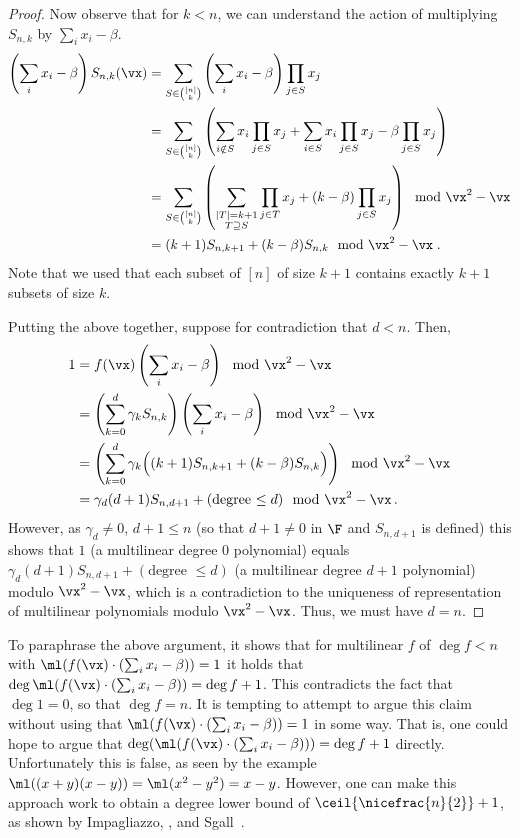 \documentclass[11pt]{article}
\numberwithin{equation}{section}
\theoremstyle{definition}
\theoremstyle{plain}
\begin{document}
\begin{proof}
        Now observe that for $k<n$, we can understand the action of multiplying $S_{n,k}$ by $\sum_i x_i-\beta$.
        \begin{align*}
                \left(\sum_i x_i-\beta\right) S_{n,k}(\vx)
                &=\sum_{S\in\binom{[n]}{k}} \left(\sum_i x_i-\beta\right) \prod_{j\in S} x_j\\
                &=\sum_{S\in\binom{[n]}{k}} \left(\sum_{i\notin S} x_i \prod_{j\in S} x_j+\sum_{i\in S} x_i \prod_{j\in S} x_j-\beta \prod_{j\in S} x_j\right)\\
                &=\sum_{S\in\binom{[n]}{k}} \left(\sum_{\substack{|T|=k+1\\T\supseteq S}} \prod_{j\in T}x_j +(k-\beta) \prod_{j\in S} x_j\right) \mod \vx^2-\vx\\
                &=(k+1)S_{n,k+1}+(k-\beta)S_{n,k}\mod \vx^2-\vx
                \;.
        \end{align*}
        Note that we used that each subset of $[n]$ of size $k+1$ contains exactly $k+1$ subsets of size $k$.

        Putting the above together, suppose for contradiction that $d<n$.  Then,
        \begin{align*}
                1
                &=f(\vx)\left(\sum_i x_i-\beta\right) \mod \vx^2-\vx\\
                &=\left(\sum_{k=0}^d \gamma_k S_{n,k}\right)\left(\sum_i x_i-\beta\right) \mod \vx^2-\vx\\
                &=\left(\sum_{k=0}^d \gamma_k \Big((k+1)S_{n,k+1}+(k-\beta)S_{n,k}\Big)\right) \mod \vx^2-\vx\\
                &=\gamma_d(d+1)S_{n,d+1} + (\text{degree $\le d$}) \mod \vx^2-\vx\,.
        \end{align*}
        However, as $\gamma_d\ne 0$, $d+1\le n$ (so that $d+1\ne 0$ in $\F$ and $S_{n,d+1}$ is defined) this shows that $1$ (a multilinear degree 0 polynomial) equals $\gamma_d(d+1)S_{n,d+1} + (\text{degree $\le d$})$ (a multilinear degree $d+1$ polynomial) modulo $\vx^2-\vx$, which is a contradiction to the uniqueness of representation of multilinear polynomials modulo $\vx^2-\vx$.  Thus, we must have $d=n$.
\end{proof}

To paraphrase the above argument, it shows that for multilinear $f$ of $\deg f<n$ with $\ml(f(\vx)\cdot (\sum_i x_i-\beta))=1$ it holds that $\deg \ml(f(\vx)\cdot (\sum_i x_i-\beta))=\deg f+1$. This contradicts the fact that $\deg 1=0$, so that $\deg f=n$.  It is tempting to attempt to argue this claim without using that $\ml(f(\vx)\cdot (\sum_i x_i-\beta))=1$ in some way. That is, one could hope to argue that $\deg(\ml(f(\vx)\cdot(\sum_i x_i-\beta)))= \deg f+1$ directly.  Unfortunately this is false, as seen by the example $\ml((x+y)(x-y))=\ml(x^2-y^2)=x-y$.  However, one can make this approach work to obtain a degree lower bound of $\ceil{\nicefrac{n}{2}}+1$, as shown by Impagliazzo, \Pudlak, and Sgall~\cite{IPS99}.
\end{document}
